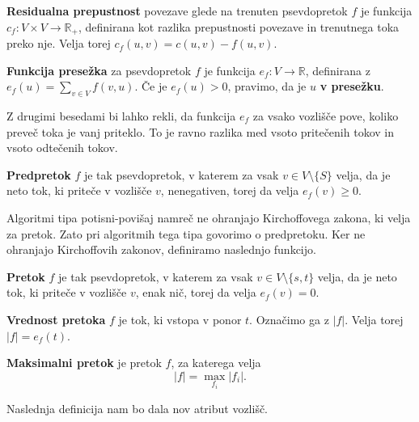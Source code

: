 \documentclass[mat1]{fmfdelo}
\begin{document}
\begin{definicija}
\textbf{Residualna prepustnost} povezave glede na trenuten psevdopretok $f$ je funkcija $c_f \colon V \times V \rightarrow \mathbb{R}_+$, definirana kot razlika prepustnosti povezave in trenutnega toka preko nje. Velja torej $c_f(u,v) = c(u,v) - f(u,v)$.
\end{definicija}

\begin{definicija}
\textbf{Funkcija presežka} za psevdopretok $f$ je funkcija $e_f \colon V \rightarrow \mathbb{R}$, definirana z $e_f(u) = \sum_{v \in V} f(v,u)$. Če je $e_f(u) > 0$, pravimo, da je $u$ \textbf{v presežku}.
\end{definicija}

Z drugimi besedami bi lahko rekli, da funkcija $e_f$ za vsako vozlišče pove, koliko preveč toka je vanj priteklo. To je ravno razlika med vsoto pritečenih tokov in vsoto odtečenih tokov.\\

\begin{definicija}
\textbf{Predpretok} $f$ je tak psevdopretok, v katerem za vsak $v \in V \setminus\{S\}$ velja, da je neto tok, ki priteče v vozlišče $v$, nenegativen, torej da velja $e_f(v) \geq 0$.
\end{definicija}

Algoritmi tipa potisni-povišaj namreč ne ohranjajo Kirchoffovega zakona, ki velja za pretok. Zato pri algoritmih tega tipa govorimo o predpretoku. Ker ne ohranjajo Kirchoffovih zakonov, definiramo naslednjo funkcijo.\\

\begin{definicija}
\textbf{Pretok} $f$ je tak psevdopretok, v katerem za vsak $v \in V \setminus\{s,t\}$ velja, da je neto tok, ki priteče v vozlišče $v$, enak nič, torej da velja $e_f(v) = 0$.
\end{definicija}

\begin{definicija}
\textbf{Vrednost pretoka} $f$ je tok, ki vstopa v ponor $t$. Označimo ga z $|f|$. Velja torej $|f| = e_f(t)$.
\end{definicija}

\begin{definicija}
\textbf{Maksimalni pretok} je pretok $f$, za katerega velja \[|f| = \max_{f_i} |f_i|.\]
\end{definicija}

Naslednja definicija nam bo dala nov atribut vozlišč.
\end{document}
